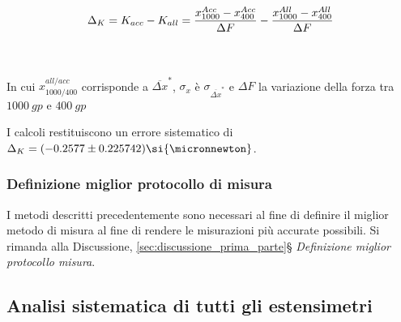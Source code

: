 \documentclass[a4paper,11pt,oneside]{article}
\begin{document}
\begin{equation*}
    \Delta_{K} = K_{acc}- K_{all}=\frac{x^{Acc}_{1000}-x^{Acc}_{400}}{\Delta F}-\frac{x^{All}_{1000}-x^{All}_{400}}{\Delta F} \\
\end{equation*}
    
\\
\\
In cui $x_{1000 / 400}^{all / acc}$ corrisponde a $\overline{\Delta x}^\ast$, $\sigma_{x}$ è $\sigma_{\overline{\Delta x}^\ast}$ e $\Delta F$ la variazione della forza tra $\SI{1000}{gp}$ e $\SI{400}{gp}$

I calcoli restituiscono un errore sistematico di $\Delta_{K} = (-0.2577 \pm 0.225742) \si{\micronnewton}$. 

\subsubsection*{Definizione miglior protocollo di misura}
I metodi descritti precedentemente sono necessari al fine di definire il miglior metodo di misura al fine di rendere le misurazioni più accurate possibili.
Si rimanda alla Discussione, \ref{sec:discussione_prima_parte}\S \textit{ Definizione miglior protocollo misura}. 



\subsection{Analisi sistematica di tutti gli estensimetri}
\end{document}
